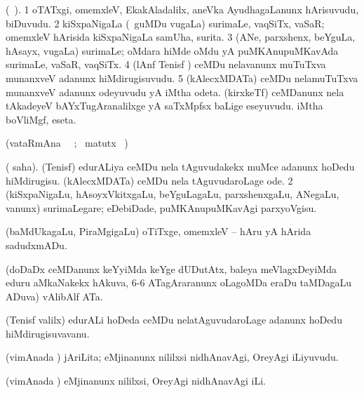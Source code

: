 \bentry
{} 
\gl{\nA}(\bava\ ). 
\bmng
\bnum
\num{1} oTATxgi, omemxleV, EkakAladalilx, aneVka AyudhagaLanunx hArisuvudu, biDuvudu. 
\num{2} kiSxpaNigaLa (\udA\ guMDu \mo vugaLa) surimaLe, vaqSiTx, vaSaR; omemxleV hArisida kiSxpaNigaLa samUha, surita. 
\num{3} (ANe, parxshenx, beYguLa, hAsayx, \mo vugaLa) surimaLe; oMdara hiMde oMdu yA puMKAnupuMKavAda surimaLe, vaSaR, vaqSiTx. 
\num{4} (lAnf Tenisf \mo) ceMDu nelavanunx muTuTxva munanxveV adanunx hiMdirugisuvudu. 
\num{5} (kAlecxMDATa) ceMDu nelamuTuTxva munanxveV adanunx odeyuvudu yA iMtha odeta. 
 (kirxkeTf) 
\banum
{} ceMDanunx nela tAkadeyeV bAYxTugAranalilxge yA saTxMpfsx baLige eseyuvudu. 
 iMtha boVliMgf, eseta. 
\eanum
\numie
\enum
\emng
\eentry

\bentry
{} 
\gl{\kirx}(vataRmAna \parxpu\ \Eva\ ; \BU\ matutx
\BUkaq\ ) \bmng
\emng

\noindent
\gl{\sakirx}
\expl{}
\bmng
\bnum
{} ({\akirx} saha). 
\banum
{} (Tenisf) edurALiya ceMDu nela tAguvudakekx muMce adanunx hoDedu hiMdirugisu. 
 (kAlecxMDATa) ceMDu nela tAguvudaroLage ode. 
\eanum
\numie
\num{2} (kiSxpaNigaLu, hAsoyxVkitxgaLu, beYguLagaLu, parxshenxgaLu, ANegaLu, \mo vanunx) surimaLegare; eDebiDade, puMKAnupuMKavAgi parxyoVgisu. 
\enum
\emng

\noindent 
\gl{\akirx}
\expl{}
\bmng
 (baMdUkagaLu, PiraMgigaLu) oTiTxge, omemxleV -- hAru yA hArida sadudxmADu. 
\emng
\eentry

\bentry 
{} 
\gl{\nA}
\expl{}
\bmng
 (doDaDx ceMDanunx keYyiMda keYge dUDutAtx, baleya meVlagxDeyiMda eduru aMkaNakekx hAkuva, 6-6 ATagAraranunx oLagoMDa eraDu taMDagaLu ADuva) vAlibAlf ATa. 
\emng
\eentry

\bentry 
{} 
\gl{\nA}
\expl{}
\bmng
 (Tenisf \mo valilx) edurALi hoDeda ceMDu nelatAguvudaroLage adanunx hoDedu hiMdirugisuvavanu. 
\emng
\eentry

\bentry 
{} 
\gl{\akirx}
\expl{}
\bmng
 (vimAnada \vi) jAriLita; eMjinanunx nililxsi nidhAnavAgi, OreyAgi iLiyuvudu. 
\emng
\eentry

\bentry 
{} 
\gl{\akirx}
\expl{}
\bmng
 (vimAnada \vi) eMjinanunx nililxsi, OreyAgi nidhAnavAgi iLi. 
\emng
\eentry

\bentry
{}
\gl{\saMkiSx}
\expl{}
\bmng
\emng
\eentry

